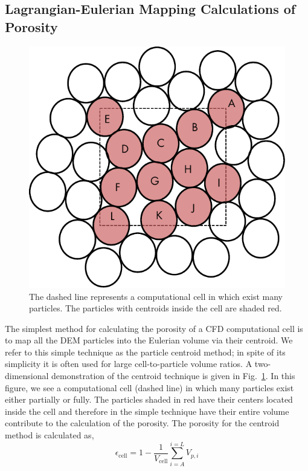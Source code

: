 \subsection{Lagrangian-Eulerian Mapping Calculations of Porosity}\label{sec:lag-eul-mapping}
\begin{figure}[t]
	\centering
	\includegraphics[width=\singleimagewidth]{chapters/figures/void-fraction-cell.pdf}
	\caption{The dashed line represents a computational cell in which exist many particles. The particles with centroids inside the cell are shaded red.}\label{fig:centroid-void-fraction}
\end{figure}
The simplest method for calculating the porosity of a CFD computational cell is to map all the DEM particles into the Eulerian volume via their centroid. We refer to this simple technique as the particle centroid method; in spite of its simplicity it is often used for large cell-to-particle volume ratios.\cite{Xu1997} A two-dimensional demonstration of the centroid technique is given in Fig.~\ref{fig:centroid-void-fraction}. In this figure, we see a computational cell (dashed line) in which many particles exist either partially or fully. The particles shaded in red have their centers located inside the cell and therefore in the simple technique have their entire volume contribute to the calculation of the porosity. The porosity for the centroid method is calculated as,
\begin{equation}
	\epsilon_\text{cell} = 1-\frac{1}{V_\text{cell}}\sum_{i = A}^{i=L}V_{p,i}
\end{equation}
